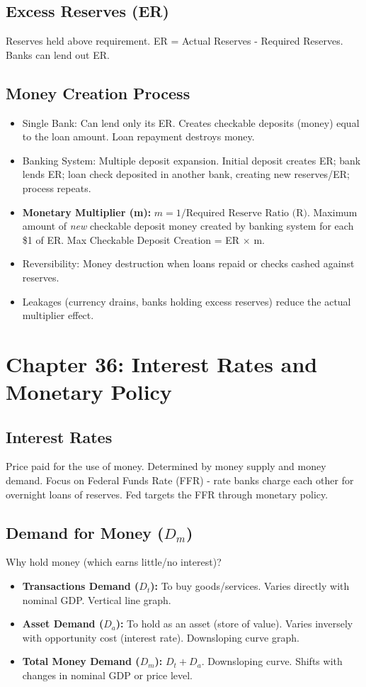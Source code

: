 \documentclass{article}
\begin{document}
\subsection*{Excess Reserves (ER)}
Reserves held above requirement. ER = Actual Reserves - Required Reserves. Banks can lend out ER.

\subsection*{Money Creation Process}
\begin{itemize}
    \item Single Bank: Can lend only its ER. Creates checkable deposits (money) equal to the loan amount. Loan repayment destroys money.
    \item Banking System: Multiple deposit expansion. Initial deposit creates ER; bank lends ER; loan check deposited in another bank, creating new reserves/ER; process repeats.
    \item \textbf{Monetary Multiplier (m):} $m = 1 / \text{Required Reserve Ratio (R)}$. Maximum amount of \textit{new} checkable deposit money created by banking system for each \$1 of ER. Max Checkable Deposit Creation = ER $\times$ m.
    \item Reversibility: Money destruction when loans repaid or checks cashed against reserves.
    \item Leakages (currency drains, banks holding excess reserves) reduce the actual multiplier effect.
\end{itemize}

\section*{Chapter 36: Interest Rates and Monetary Policy}

\subsection*{Interest Rates}
Price paid for the use of money. Determined by money supply and money demand. Focus on Federal Funds Rate (FFR) - rate banks charge each other for overnight loans of reserves. Fed targets the FFR through monetary policy.

\subsection*{Demand for Money ($D_m$)}
Why hold money (which earns little/no interest)?
\begin{itemize}
    \item \textbf{Transactions Demand ($D_t$):} To buy goods/services. Varies directly with nominal GDP. Vertical line graph.
    \item \textbf{Asset Demand ($D_a$):} To hold as an asset (store of value). Varies inversely with opportunity cost (interest rate). Downsloping curve graph.
    \item \textbf{Total Money Demand ($D_m$):} $D_t + D_a$. Downsloping curve. Shifts with changes in nominal GDP or price level.
\end{itemize}
\end{document}
